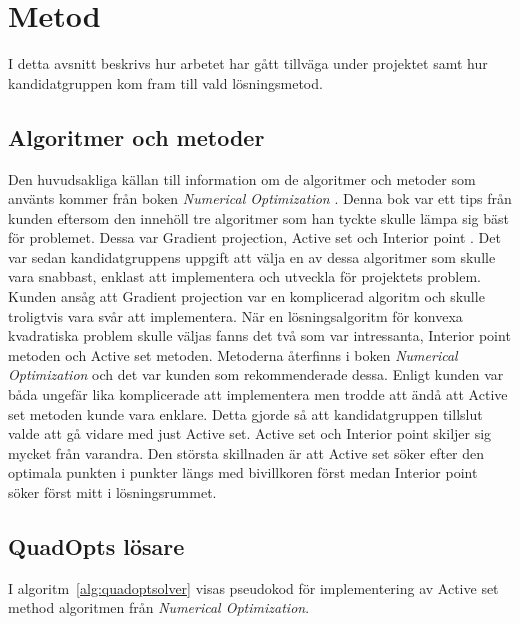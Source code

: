 \section{Metod}
I detta avsnitt beskrivs hur arbetet har gått tillväga under projektet samt hur kandidatgruppen kom fram till vald lösningsmetod. 

\subsection{Algoritmer och metoder} 
\label{sec:algmet}
Den huvudsakliga källan till information om de algoritmer och metoder som använts kommer från boken \emph{Numerical Optimization} \citep{numericaloptimization}. Denna bok var ett tips från kunden eftersom den innehöll tre algoritmer som han tyckte skulle lämpa sig bäst för problemet. Dessa var Gradient projection, Active set och Interior point . Det var sedan kandidatgruppens uppgift att välja en av dessa algoritmer som skulle vara snabbast, enklast att implementera och utveckla för projektets problem.
\newline
\newline
Kunden ansåg att Gradient projection var en komplicerad algoritm och skulle troligtvis vara svår att implementera.
När en lösningsalgoritm för konvexa kvadratiska problem skulle väljas fanns det två som var intressanta, Interior point metoden och Active set metoden. Metoderna återfinns i boken \emph{Numerical Optimization} \citep{numericaloptimization} och det var kunden som rekommenderade dessa. Enligt kunden var båda ungefär lika komplicerade att implementera men trodde att ändå att Active set metoden kunde vara enklare. Detta gjorde så att kandidatgruppen tillslut valde att gå vidare med just Active set. Active set och Interior point skiljer sig mycket från varandra. Den största skillnaden är att Active set söker efter den optimala punkten i punkter längs med bivillkoren först medan Interior point söker först mitt i lösningsrummet.
\\
\subsection{QuadOpts lösare}
I algoritm~\ref{alg:quadoptsolver} visas pseudokod för implementering av Active set method algoritmen från \emph{Numerical Optimization}.

